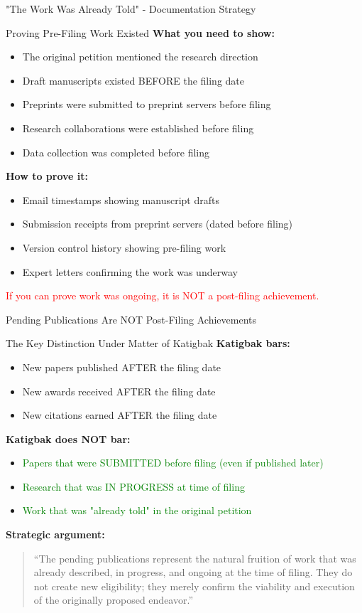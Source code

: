 \documentclass[11pt]{beamer}
\begin{document}
	\begin{frame}{"The Work Was Already Told" - Documentation Strategy}
		\scriptsize
		\begin{block}{Proving Pre-Filing Work Existed}
			\textbf{What you need to show:}
			\begin{itemize}
				\item The original petition mentioned the research direction
				\item Draft manuscripts existed BEFORE the filing date
				\item Preprints were submitted to preprint servers before filing
				\item Research collaborations were established before filing
				\item Data collection was completed before filing
			\end{itemize}
			\textbf{How to prove it:}
			\begin{itemize}
				\item Email timestamps showing manuscript drafts
				\item Submission receipts from preprint servers (dated before filing)
				\item Version control history showing pre-filing work
				\item Expert letters confirming the work was underway
			\end{itemize}
			\textcolor{red}{If you can prove work was ongoing, it is NOT a post-filing achievement.}
		\end{block}
	\end{frame}
	
	\begin{frame}{Pending Publications Are NOT Post-Filing Achievements}
		\scriptsize
		\begin{block}{The Key Distinction Under Matter of Katigbak}
			\textbf{Katigbak bars:}
			\begin{itemize}
				\item New papers published AFTER the filing date
				\item New awards received AFTER the filing date
				\item New citations earned AFTER the filing date
			\end{itemize}
			\textbf{Katigbak does NOT bar:}
			\begin{itemize}
				\item \textcolor{green}{Papers that were SUBMITTED before filing (even if published later)}
				\item \textcolor{green}{Research that was IN PROGRESS at time of filing}
				\item \textcolor{green}{Work that was "already told" in the original petition}
			\end{itemize}
			\textbf{Strategic argument:}
			\begin{quote}
				``The pending publications represent the natural fruition of work that was already described, in progress, and ongoing at the time of filing. They do not create new eligibility; they merely confirm the viability and execution of the originally proposed endeavor.''
			\end{quote}
		\end{block}
	\end{frame}
	
\end{document}
